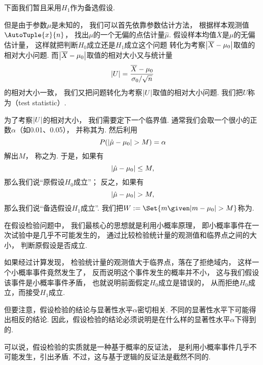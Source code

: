 下面我们暂且采用\(H_1\)作为备选假设.

但是由于参数\(\mu\)是未知的，
我们可以首先依靠参数估计方法，
根据样本观测值\(\AutoTuple{x}{n}\)，
找出\(\mu\)的一个无偏的点估计量\(\hat{\mu}\).
假设样本均值\(\overline{X}\)是\(\mu\)的无偏估计量，
这样就把判断\(H_0\)成立还是\(H_1\)成立这个问题
转化为考察\(\abs{\overline{X}-\mu_0}\)取值的相对大小问题.
而\(\abs{\overline{X}-\mu_0}\)取值的相对大小又与统计量\[
	\abs{U} = \frac{\overline{X}-\mu_0}{\sigma_0/\sqrt{n}}
\]的相对大小一致，
我们又把问题转化为考察\(\abs{U}\)取值的相对大小问题.
我们把\(U\)称为（test statistic）.

为了考察\(\abs{U}\)的相对大小，
我们需要定下一个临界值.
通常我们会取一个很小的正数\(\alpha\)（如0.01、0.05），
并称其为.
然后利用\[
	P(\abs{\hat{\mu} - \mu_0} > M) = \alpha
\]解出\(M\)，
称之为.
于是，如果有\[
	\abs{\hat{\mu} - \mu_0} \leq M,
\]
那么我们说“原假设\(H_0\)成立”；
反之，如果有\[
	\abs{\hat{\mu} - \mu_0} > M,
\]
那么我们说“备选假设\(H_1\)成立”.
我们把\(W \defeq \Set{ m \given \abs{m - \mu_0} > M }\)称为.


在假设检验问题中，
我们最核心的思想就是利用小概率原理，
即小概率事件在一次试验中是几乎不可能发生的，
通过比较检验统计量的观测值和临界点之间的大小，
判断原假设是否成立.

如果经过计算发现，
检验统计量的观测值大于临界点，落在了拒绝域内，
这样一个小概率事件竟然发生了，
反而说明这个事件发生的概率并不小，
这与我们假设该事件是小概率事件矛盾，
也就说明前面假定\(H_0\)成立是错误的，
从而拒绝\(H_0\)成立，而接受\(H_1\)成立.

但要注意，假设检验的结论与显著性水平\(\alpha\)密切相关.
不同的显著性水平下可能得出相反的结论.
因此，假设检验的结论必须说明是在什么样的显著性水平\(\alpha\)下得到的.

可以说，假设检验的实质就是一种基于概率的反证法，
是利用小概率事件几乎不可能发生，引出矛盾.
不过，这与基于逻辑的反证法是截然不同的.

